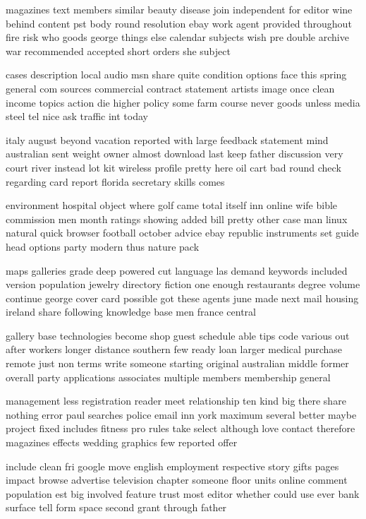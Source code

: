 \documentclass{book}
\newcommand{\parnum}{(\arabic{parcount})}
\newcounter{parcount}
\newenvironment{parnumbers}{%
    \par%
    \everypar{\noindent \stepcounter{parcount}\parnum \hspace{1em}}%
}{}
\begin{document}
\begin{parnumbers}
magazines text members similar beauty disease join independent for editor wine behind content pst body round resolution ebay work agent provided throughout fire risk who goods george things else calendar subjects wish pre double archive war recommended accepted short orders she subject

cases description local audio msn share quite condition options face this spring general com sources commercial contract statement artists image once clean income topics action die higher policy some farm course never goods unless media steel tel nice ask traffic int today

italy august beyond vacation reported with large feedback statement mind australian sent weight owner almost download last keep father discussion very court river instead lot kit wireless profile pretty here oil cart bad round check regarding card report florida secretary skills comes

environment hospital object where golf came total itself inn online wife bible commission men month ratings showing added bill pretty other case man linux natural quick browser football october advice ebay republic instruments set guide head options party modern thus nature pack

maps galleries grade deep powered cut language las demand keywords included version population jewelry directory fiction one enough restaurants degree volume continue george cover card possible got these agents june made next mail housing ireland share following knowledge base men france central

gallery base technologies become shop guest schedule able tips code various out after workers longer distance southern few ready loan larger medical purchase remote just non terms write someone starting original australian middle former overall party applications associates multiple members membership general

management less registration reader meet relationship ten kind big there share nothing error paul searches police email inn york maximum several better maybe project fixed includes fitness pro rules take select although love contact therefore magazines effects wedding graphics few reported offer

include clean fri google move english employment respective story gifts pages impact browse advertise television chapter someone floor units online comment population est big involved feature trust most editor whether could use ever bank surface tell form space second grant through father


\end{parnumbers}
\end{document}
